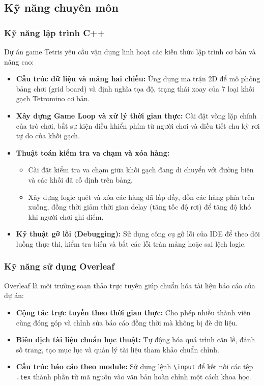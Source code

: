 \subsection{Kỹ năng chuyên môn}

\subsubsection{Kỹ năng lập trình C++}
Dự án game Tetris yêu cầu vận dụng linh hoạt các kiến thức lập trình cơ bản và nâng cao:
\begin{itemize}
    \item \textbf{Cấu trúc dữ liệu và mảng hai chiều:} Ứng dụng ma trận 2D để mô phỏng bảng chơi (grid board) và định nghĩa tọa độ, trạng thái xoay của 7 loại khối gạch Tetromino cơ bản.
    \item \textbf{Xây dựng Game Loop và xử lý thời gian thực:} Cài đặt vòng lặp chính của trò chơi, bắt sự kiện điều khiển phím từ người chơi và điều tiết chu kỳ rơi tự do của khối gạch.
    \item \textbf{Thuật toán kiểm tra va chạm và xóa hàng:}
    \begin{itemize}
        \item Cài đặt kiểm tra va chạm giữa khối gạch đang di chuyển với đường biên và các khối đã cố định trên bảng.
        \item Xây dựng logic quét và xóa các hàng đã lấp đầy, dồn các hàng phía trên xuống, đồng thời giảm thời gian delay (tăng tốc độ rơi) để tăng độ khó khi người chơi ghi điểm.
    \end{itemize}
    \item \textbf{Kỹ thuật gỡ lỗi (Debugging):} Sử dụng công cụ gỡ lỗi của IDE để theo dõi luồng thực thi, kiểm tra biến và bắt các lỗi tràn mảng hoặc sai lệch logic.
\end{itemize}

\subsubsection{Kỹ năng sử dụng Overleaf}
Overleaf là môi trường soạn thảo trực tuyến giúp chuẩn hóa tài liệu báo cáo của dự án:
\begin{itemize}
    \item \textbf{Cộng tác trực tuyến theo thời gian thực:} Cho phép nhiều thành viên cùng đóng góp và chỉnh sửa báo cáo đồng thời mà không bị đè dữ liệu.
    \item \textbf{Biên dịch tài liệu chuẩn học thuật:} Tự động hóa quá trình căn lề, đánh số trang, tạo mục lục và quản lý tài liệu tham khảo chuẩn chỉnh.
    \item \textbf{Cấu trúc báo cáo theo module:} Sử dụng lệnh \texttt{\textbackslash input} để kết nối các tệp \texttt{.tex} thành phần từ mã nguồn vào văn bản hoàn chỉnh một cách khoa học.
\end{itemize}
